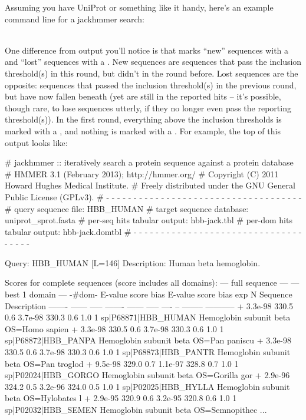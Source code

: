 Assuming you have UniProt or something like it handy, here's an
example command line for a jackhmmer search:

\\

One difference from  output you'll notice is that
 marks ``new'' sequences with a \ccode{+} and ``lost''
sequences with a \ccode{-}. New sequences are sequences that pass the
inclusion threshold(s) in this round, but didn't in the round before.
Lost sequences are the opposite: sequences that passed the inclusion
threshold(s) in the previous round, but have now fallen beneath (yet
are still in the reported hits -- it's possible, though rare, to lose
sequences utterly, if they no longer even pass the reporting
threshold(s)).  In the first round, everything above the inclusion
thresholds is marked with a \ccode{+}, and nothing is marked with a
\ccode{-}. For example, the top of this output looks like:

\begin{samepage}
\begin{sreoutput}
# jackhmmer :: iteratively search a protein sequence against a protein database
# HMMER 3.1 (February 2013); http://hmmer.org/
# Copyright (C) 2011 Howard Hughes Medical Institute.
# Freely distributed under the GNU General Public License (GPLv3).
# - - - - - - - - - - - - - - - - - - - - - - - - - - - - - - - - - - - -
# query sequence file:             HBB_HUMAN
# target sequence database:        uniprot_sprot.fasta
# per-seq hits tabular output:     hbb-jack.tbl
# per-dom hits tabular output:     hbb-jack.domtbl
# - - - - - - - - - - - - - - - - - - - - - - - - - - - - - - - - - - - -

Query:       HBB_HUMAN  [L=146]
Description: Human beta hemoglobin.

Scores for complete sequences (score includes all domains):
   --- full sequence ---   --- best 1 domain ---    -#dom-
    E-value  score  bias    E-value  score  bias    exp  N  Sequence              Description
    ------- ------ -----    ------- ------ -----   ---- --  --------              -----------
+   3.3e-98  330.5   0.6    3.7e-98  330.3   0.6    1.0  1  sp|P68871|HBB_HUMAN    Hemoglobin subunit beta OS=Homo sapien
+   3.3e-98  330.5   0.6    3.7e-98  330.3   0.6    1.0  1  sp|P68872|HBB_PANPA    Hemoglobin subunit beta OS=Pan paniscu
+   3.3e-98  330.5   0.6    3.7e-98  330.3   0.6    1.0  1  sp|P68873|HBB_PANTR    Hemoglobin subunit beta OS=Pan troglod
+   9.5e-98  329.0   0.7    1.1e-97  328.8   0.7    1.0  1  sp|P02024|HBB_GORGO    Hemoglobin subunit beta OS=Gorilla gor
+   2.9e-96  324.2   0.5    3.2e-96  324.0   0.5    1.0  1  sp|P02025|HBB_HYLLA    Hemoglobin subunit beta OS=Hylobates l
+   2.9e-95  320.9   0.6    3.2e-95  320.8   0.6    1.0  1  sp|P02032|HBB_SEMEN    Hemoglobin subunit beta OS=Semnopithec
...
\end{sreoutput}
\end{samepage}

